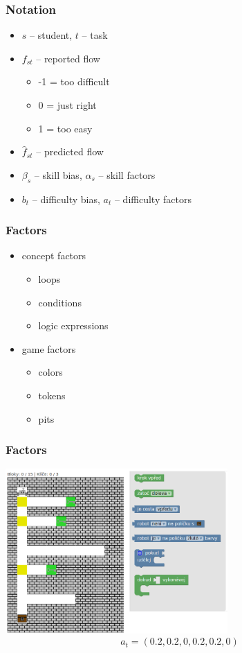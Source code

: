 \documentclass[xcolor=dvipsnames, 14pt]{beamer}
\begin{document}
\begin{frame}
\frametitle{Notation}
\begin{itemize}
\item $s$ -- student, $t$ -- task
\item $f_{st}$ -- reported flow
  \begin{itemize}
  \item -1 = too difficult
  \item 0 = just right
  \item 1 = too easy
  \end{itemize}
\item $\hat{f}_{st}$ -- predicted flow
\item $\beta_s$ -- skill bias, $\alpha_s$ -- skill factors
\item $b_t$ -- difficulty bias, $a_t$ -- difficulty factors
\end{itemize}
\end{frame}

\begin{frame}
\frametitle{Factors}
\begin{itemize}
\item concept factors
  \begin{itemize}
  \item loops
  \item conditions
  \item logic expressions
  \end{itemize}
\item game factors
  \begin{itemize}
  \item colors
  \item tokens
  \item pits
  \end{itemize}
\end{itemize}
\end{frame}

\begin{frame}
\frametitle{Factors}
\centering
\includegraphics[height=6.3cm]{img/task-colors-keys-loops-conditions.png}
\[
  a_t = (0.2, 0.2, 0, 0.2, 0.2, 0)
\]
\end{frame}
\end{document}
